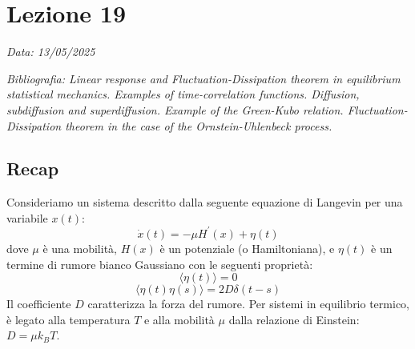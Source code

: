 \chapter{Lezione 19}
\label{chap:lezione_19} %

\begin{flushright}
\textit{Data: 13/05/2025}
\end{flushright}
\textit{Bibliografia: 
Linear response and Fluctuation-Dissipation theorem in equilibrium statistical mechanics. Examples of time-correlation functions. Diffusion, subdiffusion and superdiffusion. Example of the Green-Kubo relation. Fluctuation-Dissipation theorem in the case of the Ornstein-Uhlenbeck process.}

\section*{Recap}

Consideriamo un sistema descritto dalla seguente equazione di Langevin per una variabile $x(t)$:
\begin{equation}
\dot{x}(t)=-\mu H^{\prime}(x)+\eta(t)
\end{equation}
dove $\mu$ è una mobilità, $H(x)$ è un potenziale (o Hamiltoniana), e $\eta(t)$ è un termine di rumore bianco Gaussiano con le seguenti proprietà:
\begin{equation}
\langle\eta(t)\rangle=0
\end{equation}
\begin{equation}
\langle\eta(t)\eta(s)\rangle=2D\delta(t-s)
\end{equation}
Il coefficiente $D$ caratterizza la forza del rumore. Per sistemi in equilibrio termico, è legato alla temperatura $T$ e alla mobilità $\mu$ dalla relazione di Einstein: $D=\mu k_{B}T$.

